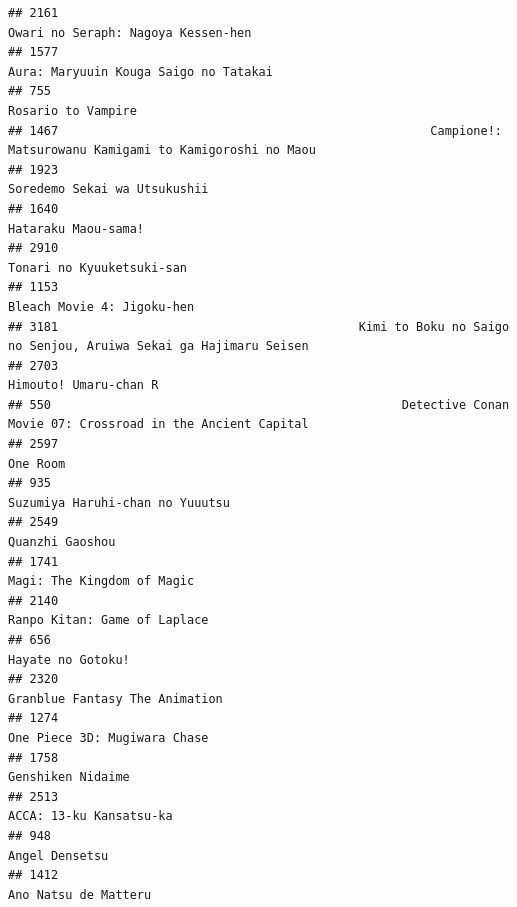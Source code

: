 \documentclass[
]{article}
\begin{document}
\begin{verbatim}
## 2161                                                                        Owari no Seraph: Nagoya Kessen-hen
## 1577                                                                     Aura: Maryuuin Kouga Saigo no Tatakai
## 755                                                                                         Rosario to Vampire
## 1467                                                    Campione!: Matsurowanu Kamigami to Kamigoroshi no Maou
## 1923                                                                              Soredemo Sekai wa Utsukushii
## 1640                                                                                       Hataraku Maou-sama!
## 2910                                                                                 Tonari no Kyuuketsuki-san
## 1153                                                                                Bleach Movie 4: Jigoku-hen
## 3181                                          Kimi to Boku no Saigo no Senjou, Aruiwa Sekai ga Hajimaru Seisen
## 2703                                                                                     Himouto! Umaru-chan R
## 550                                                 Detective Conan Movie 07: Crossroad in the Ancient Capital
## 2597                                                                                                  One Room
## 935                                                                            Suzumiya Haruhi-chan no Yuuutsu
## 2549                                                                                           Quanzhi Gaoshou
## 1741                                                                                Magi: The Kingdom of Magic
## 2140                                                                              Ranpo Kitan: Game of Laplace
## 656                                                                                          Hayate no Gotoku!
## 2320                                                                            Granblue Fantasy The Animation
## 1274                                                                              One Piece 3D: Mugiwara Chase
## 1758                                                                                         Genshiken Nidaime
## 2513                                                                                   ACCA: 13-ku Kansatsu-ka
## 948                                                                                             Angel Densetsu
## 1412                                                                                      Ano Natsu de Matteru

\end{verbatim}
\end{document}
